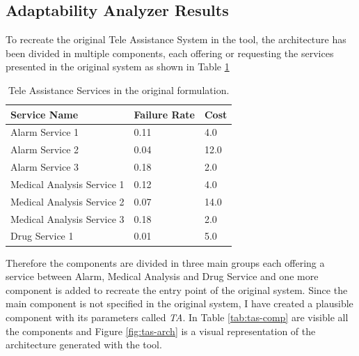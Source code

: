 \clearpage

\subsection{Adaptability Analyzer Results}

To recreate the original Tele Assistance System in the tool, the architecture has been divided in multiple components, each offering or requesting the services presented in the original system as shown in Table \ref{tab:tas-original-services}

\begin{table}[ht!b]
	\centering
	\begin{tabular}{|p{5cm}|p{3cm}|p{1cm}|}
		\hline 
		\textbf{Service Name} & \textbf{Failure Rate} & \textbf{Cost} \\ 
		\hline 
		Alarm Service 1 & 0.11 & 4.0 \\
		\hline 
		Alarm Service 2 & 0.04 & 12.0 \\ 
		\hline 
		Alarm Service 3 & 0.18 & 2.0 \\ 
		\hline 
		Medical Analysis Service 1 & 0.12 & 4.0 \\ 
		\hline
		Medical Analysis Service 2 & 0.07 & 14.0 \\ 
		\hline
		Medical Analysis Service 3 & 0.18 & 2.0 \\ 
		\hline
		Drug Service 1 & 0.01 & 5.0 \\ 
		\hline
		
	\end{tabular} 
	\caption[TAS Services]{Tele Assistance Services in the original formulation.}
	\label{tab:tas-original-services}
\end{table}

Therefore the components are divided in three main groups each offering a service between Alarm, Medical Analysis and Drug Service and one more component is added to recreate the entry point of the original system. Since the main component is not specified in the original system, I have created a plausible component with its parameters called \emph{TA}. In Table \ref{tab:tas-comp} are visible all the components and Figure \ref{fig:tas-arch} is a visual representation of the architecture generated with the tool.

